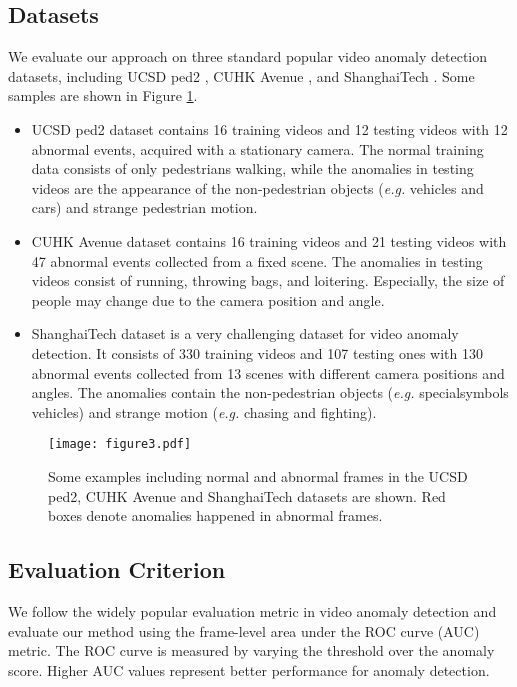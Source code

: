 \documentclass[sigconf]{acmart}
\begin{document}
\subsection{Datasets}
We evaluate our approach on three standard popular video anomaly detection datasets, including UCSD ped2 \cite{mahadevan2010anomaly}, CUHK Avenue \cite{lu2013abnormal}, and ShanghaiTech \cite{luo2017revisit}. Some samples are shown in Figure \ref{p4}.
\begin{itemize}
	\item UCSD ped2 dataset contains 16 training videos and 12 testing videos with 12 abnormal events, acquired with a stationary camera. The normal training data consists of only pedestrians walking, while the anomalies in testing videos are the appearance of the non-pedestrian objects (\emph{e.g.} vehicles and cars) and strange pedestrian motion.
	\item CUHK Avenue dataset contains 16 training videos and 21 testing videos with 47 abnormal events collected from a fixed scene. The anomalies in testing videos consist of running, throwing bags, and loitering. Especially, the size of people may change due to the camera position and angle.
	\item ShanghaiTech dataset is a very challenging dataset for video anomaly detection. It consists of 330 training videos and 107 testing ones with 130 abnormal events collected from 13 scenes with different camera positions and angles. The anomalies contain the non-pedestrian objects (\emph{e.g.} specialsymbols vehicles) and strange motion (\emph{e.g.} chasing and fighting).
\end{itemize}
\begin{figure}[ht]
	\centering
	\texttt{[image: figure3.pdf]}
	\caption{Some examples including normal and abnormal frames in the UCSD ped2, CUHK Avenue and ShanghaiTech datasets are shown. Red boxes denote anomalies happened in abnormal frames.}
	\label{p4}
\end{figure}
\subsection{Evaluation Criterion}
We follow the widely popular evaluation metric in video anomaly detection \cite{liu2018future, cai2021appearance, liu2021hybrid} and evaluate our method using the frame-level area under the ROC curve (AUC) metric. The ROC curve is measured by varying the threshold over the anomaly score. Higher AUC values represent better performance for anomaly detection.
\end{document}
